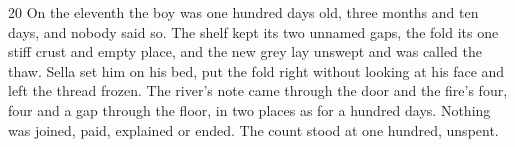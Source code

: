 \begin{CRchronicle}{20}
On the eleventh the boy was one hundred days old, three months and ten days, and nobody said so. The shelf kept its two unnamed gaps, the fold its one stiff crust and empty place, and the new grey lay unswept and was called the thaw. Sella set him on his bed, put the fold right without looking at his face and left the thread frozen. The river’s note came through the door and the fire’s four, four and a gap through the floor, in two places as for a hundred days. Nothing was joined, paid, explained or ended. The count stood at one hundred, unspent.
\end{CRchronicle}
